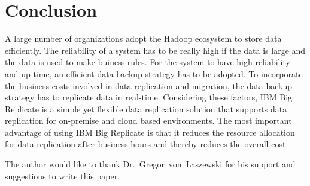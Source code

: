 \section{Conclusion}
A large number of organizations adopt the Hadoop ecosystem to store data
efficiently. The reliability of a system has to be really high if the data is
large and the data is used to make buiness rules. For the system to have high
reliability and up-time, an efficient data backup strategy has to be adopted. To
incorporate the business costs involved in data replication and migration, the
data backup strategy has to replicate data in real-time. Considering these
factors, IBM Big Replicate is a simple yet flexible data replication solution 
that supports data replication for on-premise and cloud based environments. 
The most important advantage of using IBM Big Replicate is that it reduces the
resource allocation for data replication after business hours and thereby 
reduces the overall cost.

\begin{acks}

  The author would like to thank Dr.~Gregor~von~Laszewski for his
  support and suggestions to write this paper.

\end{acks}


 

